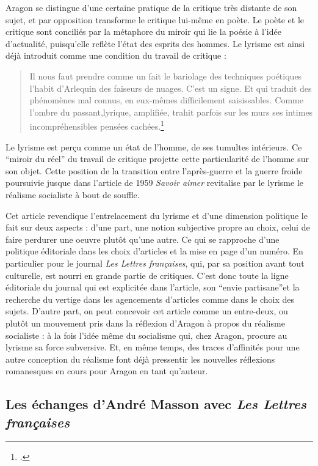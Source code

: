  Aragon se distingue d'une certaine pratique de la critique très distante de son sujet, et par opposition transforme le critique lui-même en poète. Le poète et le critique sont conciliés par la métaphore du miroir qui lie la poésie à l'idée d'actualité, puisqu'elle reflète l'état des esprits des hommes. Le lyrisme est ainsi déjà introduit comme une condition du travail de critique :

\begin{quote}Il nous faut prendre comme un fait le bariolage des techniques poétiques l’habit d’Arlequin des faiseurs de nuages. C’est un signe. Et qui traduit des phénomènes mal connus, en eux-mêmes difficilement saisissables. Comme l’ombre du passant,lyrique, amplifiée, trahit parfois sur les murs ses intimes incompréhensibles pensées cachées.\footcite[p94]{belcanto}\end{quote}

Le lyrisme est perçu comme un état de l'homme, de ses tumultes intérieurs. Ce \enquote{miroir du réel} du travail de critique projette cette particularité de l'homme sur son objet. Cette position de la transition entre l'après-guerre et la guerre froide poursuivie jusque dans l'article de 1959 \emph{Savoir aimer} revitalise par le lyrisme le réalisme socialiste à bout de souffle.


	Cet article revendique l’entrelacement du lyrisme et d'une dimension politique le fait sur deux aspects : d'une part, une notion subjective propre au choix, celui de faire perdurer une oeuvre plutôt qu’une autre. Ce qui se rapproche d’une politique éditoriale dans les choix d’articles et la mise en page d’un numéro. En particulier pour le journal \emph{Les Lettres françaises}, qui, par sa position avant tout culturelle, est nourri en grande partie de critiques. C’est donc toute la ligne éditoriale du journal qui est explicitée dans l’article, son \enquote{envie partisane}et la recherche du vertige dans les agencements d’articles comme dans le choix des sujets. D’autre part, on peut concevoir cet article comme un entre-deux, ou plutôt un mouvement pris dans la réflexion d’Aragon à propos du réalisme socialiste : à la fois l’idée même du socialisme qui, chez Aragon, procure au lyrisme sa force subversive. Et, en même temps, des traces d’affinités pour une autre conception du réalisme font déjà pressentir les nouvelles réflexions romanesques en cours pour Aragon en tant qu’auteur. 

	

\subsection{Les échanges d'André Masson avec \emph{Les Lettres françaises }}

